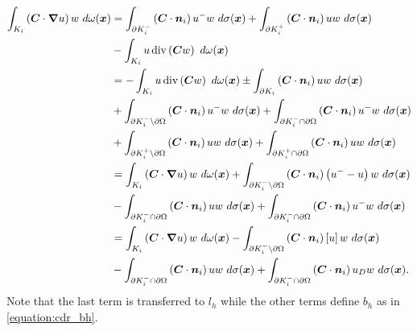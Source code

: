 \begin{align}
    \int_{K_i} \left( \bm{C} \cdot \bm{\nabla} u \right) w ~ d \omega(\bm{x}) &= \int_{\partial K_i^-} \left( \bm{C} \cdot \bm{n}_i \right) u^- w ~ d \sigma(\bm{x}) + \int_{\partial K_i^+} \left( \bm{C} \cdot \bm{n}_i \right) u w ~ d \sigma(\bm{x}) \notag \\
    &- \int_{K_i} u \operatorname*{div} \left( \bm{C} w \right) ~ d \omega(\bm{x}) \notag \\
    &= - \int_{K_i} u \operatorname*{div} \left( \bm{C} w \right) ~ d \omega(\bm{x}) \pm \int_{\partial K_i} \left( \bm{C} \cdot \bm{n}_i \right) u w ~ d \sigma(\bm{x}) \notag \\
    &+ \int_{\partial K_i^- \setminus \partial \Omega} \left( \bm{C} \cdot \bm{n}_i \right) u^- w ~ d \sigma(\bm{x}) + \int_{\partial K_i^- \cap \partial \Omega} \left( \bm{C} \cdot \bm{n}_i \right) u^- w ~ d \sigma(\bm{x}) \notag \\
    &+ \int_{\partial K_i^+ \setminus \partial \Omega} \left( \bm{C} \cdot \bm{n}_i \right) u w ~ d \sigma(\bm{x}) + \int_{\partial K_i^+ \cap \partial \Omega} \left( \bm{C} \cdot \bm{n}_i \right) u w ~ d \sigma(\bm{x}) \notag \\
    &= \int_{K_i} \left( \bm{C} \cdot \bm{\nabla} u \right) w ~ d \omega(\bm{x}) + \int_{\partial K_i^- \setminus \partial \Omega} \left( \bm{C} \cdot \bm{n}_i \right) \left( u^- - u \right) w ~ d \sigma(\bm{x}) \notag \\
    &- \int_{\partial K_i^- \cap \partial \Omega} \left( \bm{C} \cdot \bm{n}_i \right) u w ~ d \sigma(\bm{x}) + \int_{\partial K_i^- \cap \partial \Omega} \left( \bm{C} \cdot \bm{n}_i \right) u^- w ~ d \sigma(\bm{x}) \notag \\
    &= \int_{K_i} \left( \bm{C} \cdot \bm{\nabla} u \right) w ~ d \omega(\bm{x}) - \int_{\partial K_i^- \setminus \partial \Omega} \left( \bm{C} \cdot \bm{n}_i \right) \left[ u \right] w ~ d \sigma(\bm{x}) \\
    &- \int_{\partial K_i^- \cap \partial \Omega} \left( \bm{C} \cdot \bm{n}_i \right) u w ~ d \sigma(\bm{x}) + \int_{\partial K_i^- \cap \partial \Omega} \left( \bm{C} \cdot \bm{n}_i \right) u_D w ~ d \sigma(\bm{x}). \notag
\end{align}
Note that the last term is transferred to $l_h$ while the other terms define $b_h$ as in \cref{equation:cdr_bh}.

